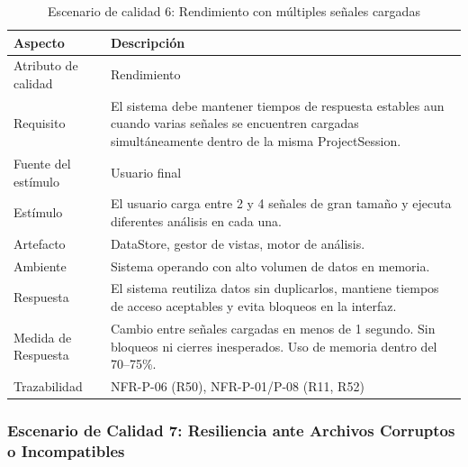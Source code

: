 \documentclass[11pt,a4paper]{article}
\DeclareRobustCommand{\_}{\textunderscore\allowbreak}
\begin{document}
\begin{table}[H]
\centering
\caption{Escenario de calidad 6: Rendimiento con múltiples señales cargadas}
\label{tab:escenario6}
\begin{tabularx}{\textwidth}{|l|X|}
\hline
\textbf{Aspecto} & \textbf{Descripción} \\
\hline
Atributo de calidad & Rendimiento \\
\hline
Requisito & El sistema debe mantener tiempos de respuesta estables aun cuando varias señales se encuentren cargadas simultáneamente dentro de la misma ProjectSession. \\
\hline
Fuente del estímulo & Usuario final \\
\hline
Estímulo & El usuario carga entre 2 y 4 señales de gran tamaño y ejecuta diferentes análisis en cada una. \\
\hline
Artefacto & DataStore, gestor de vistas, motor de análisis. \\
\hline
Ambiente & Sistema operando con alto volumen de datos en memoria. \\
\hline
Respuesta & El sistema reutiliza datos sin duplicarlos, mantiene tiempos de acceso aceptables y evita bloqueos en la interfaz. \\
\hline
Medida de Respuesta & Cambio entre señales cargadas en menos de 1 segundo. Sin bloqueos ni cierres inesperados. Uso de memoria dentro del 70--75\%. \\
\hline
Trazabilidad & NFR-P-06 (R50), NFR-P-01/P-08 (R11, R52) \\
\hline
\end{tabularx}
\end{table}

\subsubsection{Escenario de Calidad 7: Resiliencia ante Archivos Corruptos o Incompatibles}
\end{document}
